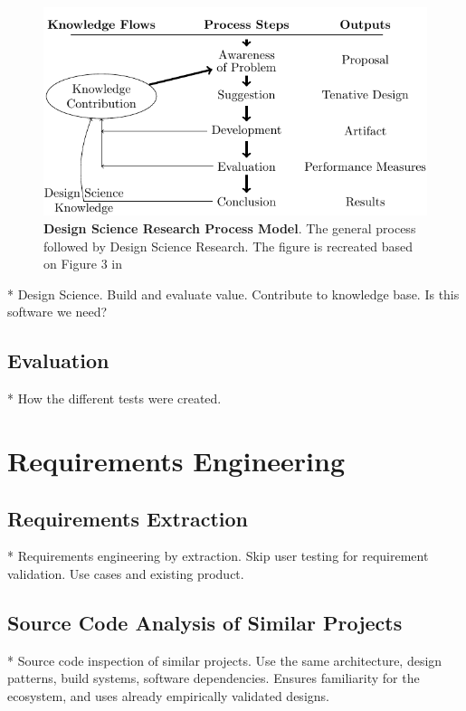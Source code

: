 \begin{figure}[htbp]  %
  \centering
  \includegraphics[width=\textwidth]{figures/dsrm-flow.pdf}
  \caption[Design Science Research Process Model]{\textbf{Design Science Research Process Model}. The general process followed by Design Science Research. The figure is recreated based on Figure 3 in \textcite[p.~11]{vijayvaishnaviDesignScienceResearch2019}}\label{fig:dsrpm}
\end{figure}

* Design Science. Build and evaluate value. Contribute to knowledge base. Is this software we need?

\subsection{Evaluation}

* How the different tests were created.

\section{Requirements Engineering}

\subsection{Requirements Extraction}

* Requirements engineering by extraction. Skip user testing for requirement validation. Use cases and existing product.

\subsection{Source Code Analysis of Similar Projects}
* Source code inspection of similar projects. Use the same architecture, design patterns, build systems, software dependencies. Ensures familiarity for the ecosystem, and uses already empirically validated designs.


